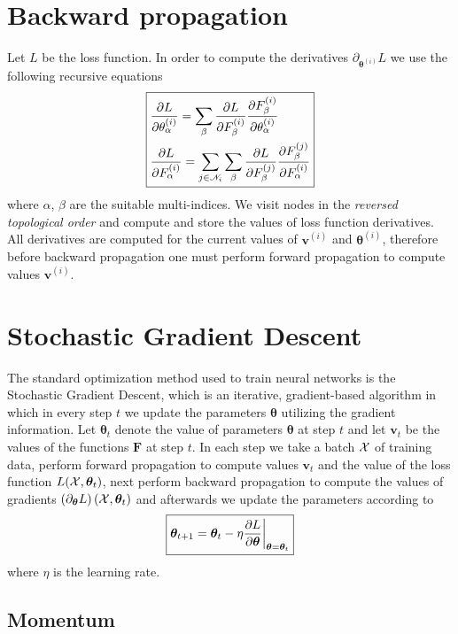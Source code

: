 \documentclass{myclass}
\begin{document}
\section{Backward propagation}

Let \(L\) be the loss function. In order to compute the derivatives
\(\partial_{\bm{\theta}^{(i)}}L\) we use the following recursive equations
\[
\boxed{
\begin{split} 
   &\pdv{L}{\theta^{(i)}_\alpha} = \sum_\beta \pdv{L}{F^{(i)}_\beta} \pdv{F^{(i)}_\beta}{\theta^{(i)}_\alpha} \\
   &\pdv{L}{F_\alpha^{(i)}} = \sum_{j \in \mathscr{N}_i} \sum_\beta \pdv{L}{F_\beta^{(j)}} \pdv{F_\beta ^{(j)}}{F_\alpha^{(i)}}
\end{split}
}
\] 
where \(\alpha\), \(\beta\) are the suitable multi-indices. We visit nodes in the \emph{reversed
topological order} and compute and store the values of loss function derivatives. All derivatives
are computed for the current values of \(\bm{v}^{(i)}\) and \(\bm{\theta}^{(i)}\), therefore before
backward propagation one must perform forward propagation to compute values \(\bm{v}^{(i)}\).


\section{Stochastic Gradient Descent}

The standard optimization method used to train neural networks is the Stochastic Gradient Descent,
which is an iterative, gradient-based algorithm in which in every step \(t\) we update the
parameters \(\bm{\theta}\) utilizing the gradient information. Let \(\bm{\theta}_t\) denote the
value of parameters \(\bm{\theta}\) at step \(t\) and let \(\bm{v}_t\) be the values of the
functions \(\bm{F}\) at step \(t\). In each step we take a batch \(\mathcal{X}\)  of training data,
perform forward propagation to compute values \(\bm{v}_t\) and the value of the loss function
\(L(\mathcal{X},\bm{\theta}_t)\), next perform backward propagation to compute the values of gradients
\((\partial_{\bm{\theta}}L)\left(\mathcal{X},\bm{\theta}_t\right)\) and
afterwards we update the parameters according to
\[
   \boxed{ \bm{\theta}_{t+1} = \bm{\theta}_t - \eta \pdv{L}{\bm{\theta}}\bigg|_{\bm{\theta}=\bm{\theta}_t} }
\] 
where \(\eta\) is the learning rate.


\subsection{Momentum}
\end{document}
